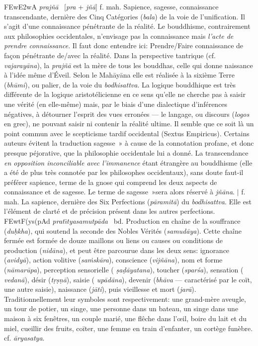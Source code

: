 \documentclass[a4paper,11pt,twocolumn]{article}
\begin{document}
{\dn \3FEw\3E2wA} {\em praj\~{n}\={a}} \ [{\em pra} + {\em jñ\={a}}]
f. mah. \og Sapience, sagesse, connaissance transcendante\fg, dernière des
Cinq Catégories ({\em bala}) de la voie de l'unification. Il s'agit d'une
connaissance pénétrante  de la réalité. Le bouddhisme,
contrairement aux philosophies occidentales, n'envisage pas la
connaissance mais {\em l'acte de prendre connaissance}. Il faut donc
entendre ici: \og Prendre/Faire connaissance de fa\c{c}on pénétrante
de/avec la réalité\fg. Dans la perspective tantrique (cf. {\em
vajaray\={a}na}), la {\em prajñ\={a}} est la mère de tous les bouddhas,
celle qui donne naissance à l'idée même d'Éveil. Selon le
Mah\={a}y\={a}na elle est réalisée à la sixième Terre ({\em bh\={u}mi}), ou
palier, de la voie du {\em bodhisattva}. La logique bouddhique
est très différente de la logique aristotélicienne en ce sens qu'elle ne
cherche pas à saisir une vérité (en elle-même) mais, par le biais d'une
dialectique d'inférences négatives, à détourner l'esprit des vues
erronées --- le langage, ou discours ({\em logos} en grec), ne pouvant
saisir ni contenir la réalité ultime. Il semble que ce soit là un
point commun avec le scepticisme tardif occidental (Sextus
Empiricus). Certains auteurs évitent la traduction
\og sagesse~» à cause de la connotation profane, et donc presque
péjorative, que la philosophie occidentale lui a donné. La
transcendance {\em en opposition inconciliable avec l'immanence} étant
étrangère au bouddhisme (elle a été de plus très connotée par les
philosophes occidentaux), sans doute faut-il préférer \og sapience\fg,
terme de la gnose qui comprend les deux aspects de connaissance et de
sagesse. Le terme de \og sagesse~»sera alors réservé à {\em
jñ\={a}na}. $\mid$ f. mah. La sapience, dernière des Six Perfections
({\em p\={a}ramit\={a}}) du {\em bodhisattva}. Elle est l'élément de
clarté et de précision présent dans les autres perfections. \\

{\dn \3FEwtF(ys(pAd} {\em prat\={\i}tyasamutp\={a}da} \
bd. Production en chaîne de la souffrance ({\em du\d{h}kha}), qui
soutend la seconde des Nobles Vérités ({\em samud\={a}ya}). Cette
chaîne fermée est formée de douze maillons ou liens ou causes ou
conditions de production ({\em nid\={a}na}), et peut être parcourue
dans les deux sens: ignorance ({\em avidy\={a}}), action volitive
({\em sa\.{m}sk\={a}ra}), conscience ({\em vij\~{n}\={a}na}), nom et
forme ({\em n\={a}mar\={u}pa}), perception sensorielle ({\em
\d{s}a\d{d}\={a}yatana}), toucher ({\em spar\'{s}a}), sensation ({\em
vedan\={a}}), désir ({\em t\d{r}\d{s}\d{n}\={a}}), saisie ({\em
up\={a}d\={a}na}), devenir ({\em bh\={a}va} --- caractérisé par le
coït, une autre saisie), naissance ({\em j\={a}ti}), puis vieillesse
et mort ({\em jar\={a}}). Traditionnellement leur symboles sont
respectivement: une grand-mère aveugle, un tour de potier, un singe,
une personne dans un bateau, un singe dans une maison à six fenêtres,
un couple marié, une flêche dans l'{\oe}il, boire du lait et du miel,
cueillir des fruits, coïter, une femme en train d'enfanter, un cortège
funèbre. cf. {\em \={a}ryasatya}. \\
\end{document}
